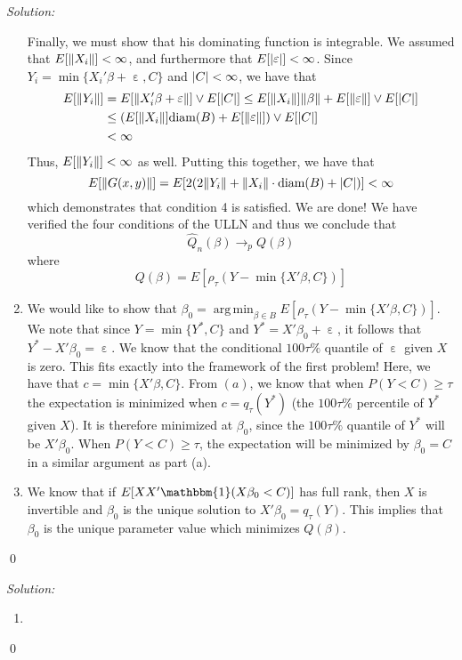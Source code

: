 \documentclass[12pt]{article}
\DeclareMathOperator*{\argmin}{arg\,min}
\DeclarePairedDelimiter\norm{\lVert}{\rVert}%
\DeclareMathOperator{\eps}{\varepsilon}
\DeclarePairedDelimiter\abs{\lvert}{\rvert}%
\newenvironment{problem}[2][Problem]{\begin{trivlist}
\item[\hskip \labelsep {\bfseries #1}\hskip \labelsep {\bfseries #2.}]}{\end{trivlist}}
\newenvironment{sol}
    {\emph{Solution:}
    }
    {
    \qed
    }
\begin{document}
\begin{sol}
\begin{enumerate}[label=\alph*) ]
    Finally, we must show that his dominating function is integrable. We assumed that $E[\norm{X_i}] < \infty$, and furthermore that $E[\abs{\eps}] < \infty$. Since $Y_i = \min\{X_i'\beta + \eps, C\}$ and $\abs{C} <\infty$, we have that 
    \begin{align*}
        E[\norm{Y_i}] &= E[\norm{X_i' \beta + \eps}] \vee E[\abs{C}] \leq E[\norm{X_i}]\norm{\beta} + E[\norm{\eps}]\vee E[\abs{C}] \\
        &\leq (E[\norm{X_i}]\text{diam}(B) + E[\norm{\eps}])\vee E[\abs{C}]  \\
        &< \infty\end{align*}
    Thus, $E[\norm{Y_i}] < \infty$ as well. Putting this together, we have that
    \[E[\norm{G(x,y)}] = E[2 (2 \norm{Y_i} + \norm{X_i} \cdot \text{diam}(B) + \abs{C})] < \infty\]
    which demonstrates that condition 4 is satisfied. We are done! We have verified the four conditions of the ULLN and thus we conclude that
    \[\hat{Q}_n(\beta) \rightarrow_p Q(\beta)\]
    where 
    \[Q(\beta) = E[\rho_{\tau}(Y - \min\{X'\beta, C\})]\]
    \item We would like to show that $\beta_0 = \argmin_{\beta \in B} E[\rho_{\tau}(Y - \min\{X'\beta, C\})]$. We note that since $Y = \min\{Y^*, C\}$ and $Y^* = X'\beta_0 + \eps$, it follows that $Y^* - X'\beta_0 = \eps$. We know that the conditional $100\tau\%$ quantile of $\eps$ given $X$ is zero. This fits exactly into the framework of the first problem! Here, we have that $c = \min\{X'\beta, C\}$. From $(a)$, we know that when $P(Y < C) \geq \tau$ the expectation is minimized when $c = q_{\tau}(Y^*)$ (the $100\tau\%$ percentile of $Y^*$ given $X$). It is therefore minimized at $\beta_0$, since the $100\tau\%$ quantile of $Y^*$ will be $X'\beta_0$.
    When $P(Y < C)\geq \tau$, the expectation will be minimized by $\beta_0 = C$ in a similar argument as part (a).
\item We know that if $E[XX' \mathbbm{1}(X\beta_0 < C)]$ has full rank, then $X$ is invertible and $\beta_0$ is the unique solution to $X' \beta_0 = q_{\tau}(Y)$. This implies that $\beta_0$ is the unique parameter value which minimizes $Q(\beta)$. 
    \end{enumerate}
\end{sol}
\begin{problem}{2}
\end{problem}
\begin{sol}
    \begin{enumerate}[label=\alph*) ]
        \item 
        \end{enumerate}


\end{sol}

    
\end{document}
